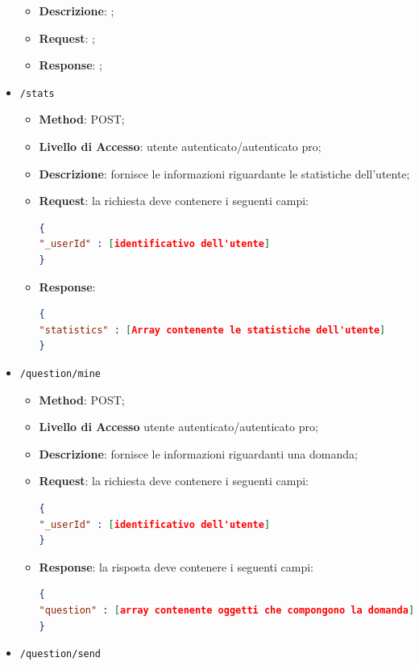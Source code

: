 \begin{itemize}
\begin{itemize}
			\item  \textbf{Descrizione}: ; 
			\item \textbf{Request}: ;
			\item \textbf{Response}: ;
		\end{itemize}
	\item \texttt{/stats}
		\begin{itemize}
			\item \textbf{Method}: POST;
			\item \textbf{Livello di Accesso}: utente autenticato/autenticato pro;
			\item \textbf{Descrizione}: fornisce le informazioni riguardante le statistiche dell'utente;
			\item \textbf{Request}: la richiesta deve contenere i seguenti campi:
\begin{lstlisting}[language=json,firstnumber=1]
{
"_userId" : [identificativo dell'utente]
}
\end{lstlisting}
			\item \textbf{Response}: 
\begin{lstlisting}[language=json,firstnumber=1]
{
"statistics" : [Array contenente le statistiche dell'utente]
}
\end{lstlisting}
		\end{itemize}
	\item \texttt{/question/mine}
		\begin{itemize}
			\item \textbf{Method}: POST;
			\item \textbf{Livello di Accesso} utente autenticato/autenticato pro;
			\item \textbf{Descrizione}: fornisce le informazioni riguardanti una domanda;
			\item \textbf{Request}: la richiesta deve contenere i seguenti campi:
\begin{lstlisting}[language=json,firstnumber=1]
{
"_userId" : [identificativo dell'utente]
}
\end{lstlisting}
			\item \textbf{Response}: la risposta deve contenere i seguenti campi:
\begin{lstlisting}[language=json,firstnumber=1]
{
"question" : [array contenente oggetti che compongono la domanda]
}
\end{lstlisting}
		\end{itemize}
	\item \texttt{/question/send}
		\begin{itemize}

\end{itemize}
\end{itemize}
